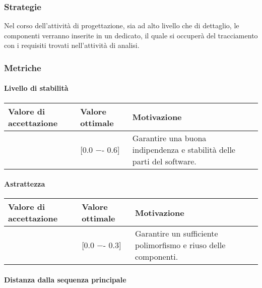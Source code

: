 \subsubsection{Strategie}
Nel corso dell'attività di progettazione, sia ad alto livello che di dettaglio, le componenti verranno inserite in un  dedicato, il quale si occuperà del tracciamento con i requisiti trovati nell'attività di analisi.


\subsubsection{Metriche}

\paragraph{Livello di stabilità}

\begin{center}
		\begin{tabular}{|P{2.5cm}|P{2.5cm}|P{6cm}|}
		\hline
			\textbf{Valore di accettazione}	& \textbf{Valore ottimale} & \textbf{Motivazione} \\
			\hline
			[0.0 −- 1] & [0.0 −- 0.6] &	Garantire una buona indipendenza e stabilità delle parti del software. \\
			\hline
			\end{tabular}
\end{center}

\paragraph{Astrattezza}

\begin{center}
		\begin{tabular}{|P{2.5cm}|P{2.5cm}|P{6cm}|}
		\hline
			\textbf{Valore di accettazione}	& \textbf{Valore ottimale} & \textbf{Motivazione} \\
			\hline
			[0.0 −- 0.8] & [0.0 −- 0.3] &	Garantire un sufficiente polimorfismo e riuso delle componenti. \\
			\hline
			\end{tabular}
\end{center}

\paragraph{Distanza dalla sequenza principale}

